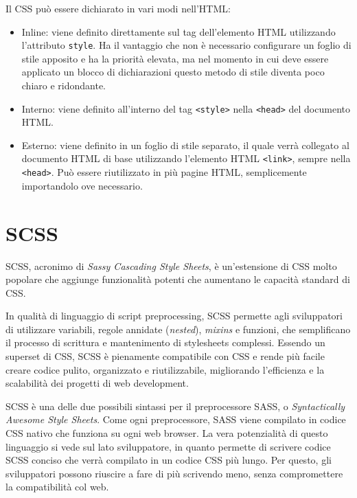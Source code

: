 Il CSS può essere dichiarato in vari modi nell'HTML:
\begin{itemize}
    \item Inline: viene definito direttamente sul tag dell'elemento HTML utilizzando l'attributo \Verb_style_. Ha il vantaggio che non è necessario configurare un foglio di stile apposito e ha la priorità elevata, ma nel momento in cui deve essere applicato un blocco di dichiarazioni questo metodo di stile diventa poco chiaro e ridondante.
    \item Interno: viene definito all'interno del tag \Verb_<style>_ nella \Verb_<head>_ del documento HTML.
    \item Esterno: viene definito in un foglio di stile separato, il quale verrà collegato al documento HTML di base utilizzando l'elemento HTML \Verb_<link>_, sempre nella \Verb_<head>_. Può essere riutilizzato in più pagine HTML, semplicemente importandolo ove necessario.
\end{itemize}

\section{SCSS}
SCSS, acronimo di \textit{Sassy Cascading Style Sheets}, è un'estensione di CSS molto popolare che aggiunge funzionalità potenti che aumentano le capacità standard di CSS.

In qualità di linguaggio di script preprocessing, SCSS permette agli sviluppatori di utilizzare variabili, regole annidate (\textit{nested}), \textit{mixins} e funzioni, che semplificano il processo di scrittura e mantenimento di stylesheets complessi. Essendo un superset di CSS, SCSS è pienamente compatibile con CSS e rende più facile creare codice pulito, organizzato e riutilizzabile, migliorando l'efficienza e la scalabilità dei progetti di web development.


SCSS è una delle due possibili sintassi per il preprocessore SASS, o \textit{Syntactically Awesome Style Sheets}. Come ogni preprocessore, SASS viene compilato in codice CSS nativo che funziona su ogni web browser. La vera potenzialità di questo linguaggio si vede sul lato sviluppatore, in quanto permette di scrivere codice SCSS conciso che verrà compilato in un codice CSS più lungo. Per questo, gli sviluppatori possono riuscire a fare di più scrivendo meno, senza compromettere la compatibilità col web.

